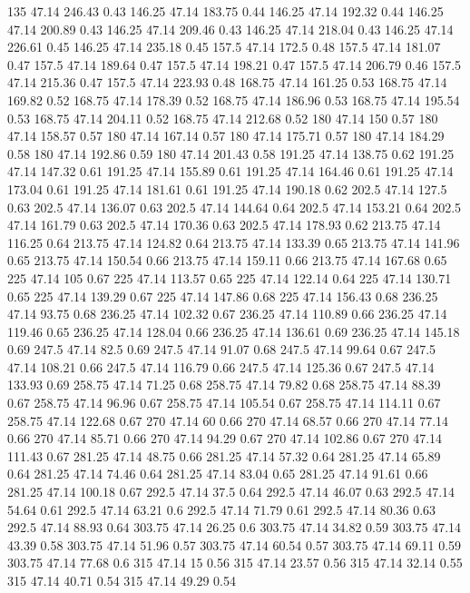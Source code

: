 135	47.14	246.43	0.43
146.25	47.14	183.75	0.44
146.25	47.14	192.32	0.44
146.25	47.14	200.89	0.43
146.25	47.14	209.46	0.43
146.25	47.14	218.04	0.43
146.25	47.14	226.61	0.45
146.25	47.14	235.18	0.45
157.5	47.14	172.5	0.48
157.5	47.14	181.07	0.47
157.5	47.14	189.64	0.47
157.5	47.14	198.21	0.47
157.5	47.14	206.79	0.46
157.5	47.14	215.36	0.47
157.5	47.14	223.93	0.48
168.75	47.14	161.25	0.53
168.75	47.14	169.82	0.52
168.75	47.14	178.39	0.52
168.75	47.14	186.96	0.53
168.75	47.14	195.54	0.53
168.75	47.14	204.11	0.52
168.75	47.14	212.68	0.52
180	47.14	150	0.57
180	47.14	158.57	0.57
180	47.14	167.14	0.57
180	47.14	175.71	0.57
180	47.14	184.29	0.58
180	47.14	192.86	0.59
180	47.14	201.43	0.58
191.25	47.14	138.75	0.62
191.25	47.14	147.32	0.61
191.25	47.14	155.89	0.61
191.25	47.14	164.46	0.61
191.25	47.14	173.04	0.61
191.25	47.14	181.61	0.61
191.25	47.14	190.18	0.62
202.5	47.14	127.5	0.63
202.5	47.14	136.07	0.63
202.5	47.14	144.64	0.64
202.5	47.14	153.21	0.64
202.5	47.14	161.79	0.63
202.5	47.14	170.36	0.63
202.5	47.14	178.93	0.62
213.75	47.14	116.25	0.64
213.75	47.14	124.82	0.64
213.75	47.14	133.39	0.65
213.75	47.14	141.96	0.65
213.75	47.14	150.54	0.66
213.75	47.14	159.11	0.66
213.75	47.14	167.68	0.65
225	47.14	105	0.67
225	47.14	113.57	0.65
225	47.14	122.14	0.64
225	47.14	130.71	0.65
225	47.14	139.29	0.67
225	47.14	147.86	0.68
225	47.14	156.43	0.68
236.25	47.14	93.75	0.68
236.25	47.14	102.32	0.67
236.25	47.14	110.89	0.66
236.25	47.14	119.46	0.65
236.25	47.14	128.04	0.66
236.25	47.14	136.61	0.69
236.25	47.14	145.18	0.69
247.5	47.14	82.5	0.69
247.5	47.14	91.07	0.68
247.5	47.14	99.64	0.67
247.5	47.14	108.21	0.66
247.5	47.14	116.79	0.66
247.5	47.14	125.36	0.67
247.5	47.14	133.93	0.69
258.75	47.14	71.25	0.68
258.75	47.14	79.82	0.68
258.75	47.14	88.39	0.67
258.75	47.14	96.96	0.67
258.75	47.14	105.54	0.67
258.75	47.14	114.11	0.67
258.75	47.14	122.68	0.67
270	47.14	60	0.66
270	47.14	68.57	0.66
270	47.14	77.14	0.66
270	47.14	85.71	0.66
270	47.14	94.29	0.67
270	47.14	102.86	0.67
270	47.14	111.43	0.67
281.25	47.14	48.75	0.66
281.25	47.14	57.32	0.64
281.25	47.14	65.89	0.64
281.25	47.14	74.46	0.64
281.25	47.14	83.04	0.65
281.25	47.14	91.61	0.66
281.25	47.14	100.18	0.67
292.5	47.14	37.5	0.64
292.5	47.14	46.07	0.63
292.5	47.14	54.64	0.61
292.5	47.14	63.21	0.6
292.5	47.14	71.79	0.61
292.5	47.14	80.36	0.63
292.5	47.14	88.93	0.64
303.75	47.14	26.25	0.6
303.75	47.14	34.82	0.59
303.75	47.14	43.39	0.58
303.75	47.14	51.96	0.57
303.75	47.14	60.54	0.57
303.75	47.14	69.11	0.59
303.75	47.14	77.68	0.6
315	47.14	15	0.56
315	47.14	23.57	0.56
315	47.14	32.14	0.55
315	47.14	40.71	0.54
315	47.14	49.29	0.54
